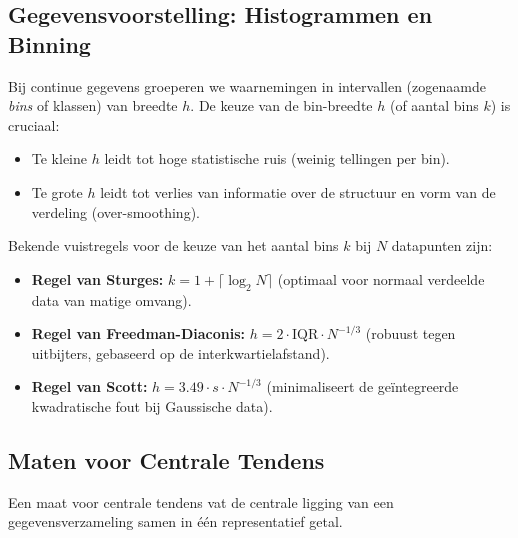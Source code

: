 \documentclass[11pt,a4paper]{article}
\begin{document}
\subsection{Gegevensvoorstelling: Histogrammen en Binning}
Bij continue gegevens groeperen we waarnemingen in intervallen (zogenaamde \emph{bins} of klassen) van breedte $h$. De keuze van de bin-breedte $h$ (of aantal bins $k$) is cruciaal:
\begin{itemize}[leftmargin=1.5em]
    \item Te kleine $h$ leidt tot hoge statistische ruis (weinig tellingen per bin).
    \item Te grote $h$ leidt tot verlies van informatie over de structuur en vorm van de verdeling (over-smoothing).
\end{itemize}
Bekende vuistregels voor de keuze van het aantal bins $k$ bij $N$ datapunten zijn:
\begin{itemize}[leftmargin=1.5em]
    \item \textbf{Regel van Sturges:} $k = 1 + \lceil \log_2 N \rceil$ (optimaal voor normaal verdeelde data van matige omvang).
    \item \textbf{Regel van Freedman-Diaconis:} $h = 2 \cdot \text{IQR} \cdot N^{-1/3}$ (robuust tegen uitbijters, gebaseerd op de interkwartielafstand).
    \item \textbf{Regel van Scott:} $h = 3.49 \cdot s \cdot N^{-1/3}$ (minimaliseert de geïntegreerde kwadratische fout bij Gaussische data).
\end{itemize}

\subsection{Maten voor Centrale Tendens}
Een maat voor centrale tendens vat de centrale ligging van een gegevensverzameling samen in één representatief getal.
\end{document}
